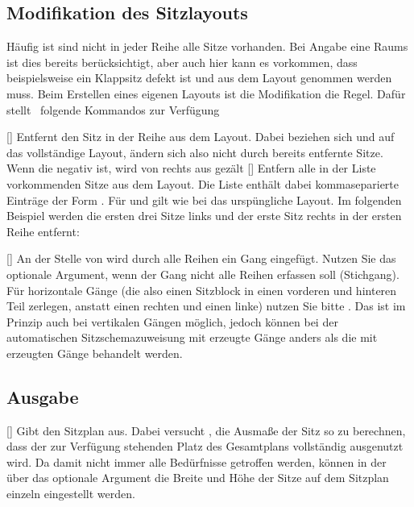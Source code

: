 \documentclass[
babel-options={ngerman},
load-preamble-,
scrartcl={headings=small}
]{cnltx-doc}
\providecommand{\packagename}{tucseating}
\def\thepkg{\pkg*{\packagename}}
\begin{document}
\subsection{Modifikation des Sitzlayouts}
\label{sec:modify-layout}
Häufig ist sind nicht in jeder Reihe alle Sitze vorhanden.
Bei Angabe eine Raums ist dies bereits berücksichtigt, aber auch hier kann es
vorkommen, dass beispielsweise ein Klappsitz defekt ist und aus dem Layout
genommen werden muss.
Beim Erstellen eines eigenen Layouts ist die Modifikation die Regel.
Dafür stellt \pkg\ folgende Kommandos zur Verfügung
\begin{commands}
  []
  Entfernt den Sitz  in der Reihe  aus dem
  Layout. Dabei beziehen sich  und  auf das
  vollständige Layout, ändern sich also nicht durch bereits entfernte Sitze.
  Wenn die  negativ ist, wird von rechts aus gezält
  []
  Entfern alle in der Liste vorkommenden Sitze aus dem Layout. Die Liste enthält
  dabei kommaseparierte Einträge der Form
  . Für  und
   gilt wie bei  das urspüngliche Layout.
  Im folgenden Beispiel werden die ersten drei Sitze links und der erste Sitz
  rechts in der ersten Reihe entfernt:
  \begin{example}
  \end{example}
  []
  An der Stelle von  wird durch alle Reihen ein Gang eingefügt. Nutzen Sie das
  optionale Argument, wenn der Gang nicht alle Reihen erfassen soll (Stichgang).
  Für horizontale Gänge (die also einen Sitzblock in einen vorderen und hinteren
  Teil zerlegen, anstatt einen rechten und einen linke) nutzen Sie bitte
  .
  Das ist im Prinzip auch bei vertikalen Gängen möglich, jedoch können bei der automatischen
  Sitzschemazuweisung mit  erzeugte Gänge anders als die mit
   erzeugten Gänge behandelt werden.
\end{commands}

\subsection{Ausgabe}
\label{sec:drawing}
\begin{commands}
  
  [\sarg{}]\Default
  Gibt den Sitzplan aus. Dabei versucht \thepkg, die Ausmaße der Sitz so zu
  berechnen, dass der zur Verfügung stehenden Platz des Gesamtplans vollständig
  ausgenutzt wird.
  Da damit nicht immer alle Bedürfnisse getroffen werden, können in der
  über das optionale Argument die Breite und Höhe der Sitze auf
  dem Sitzplan einzeln eingestellt werden.
\end{commands}
\end{document}
